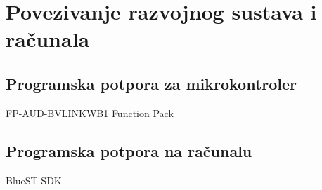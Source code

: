 \chapter{Povezivanje razvojnog sustava i računala}

\section{Programska potpora za mikrokontroler}
FP-AUD-BVLINKWB1 Function Pack
\section{Programska potpora na računalu}
BlueST SDK